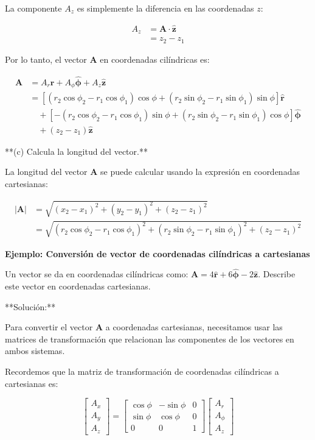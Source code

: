 \documentclass{book}
\begin{document}
La componente $A_z$ es simplemente la diferencia en las coordenadas $z$:

\begin{align*}
A_z &= \mathbf{A} \cdot \mathbf{\hat{z}} \\
&= z_2 - z_1
\end{align*}

Por lo tanto, el vector $\mathbf{A}$ en coordenadas cilíndricas es:

\begin{align*}
\mathbf{A} &= A_r \mathbf{\hat{r}} + A_{\phi} \mathbf{\hat{\phi}} + A_z \mathbf{\hat{z}} \\
&= [(r_2 \cos \phi_2 - r_1 \cos \phi_1) \cos \phi + (r_2 \sin \phi_2 - r_1 \sin \phi_1) \sin \phi] \mathbf{\hat{r}} \\
&\quad + [-(r_2 \cos \phi_2 - r_1 \cos \phi_1) \sin \phi + (r_2 \sin \phi_2 - r_1 \sin \phi_1) \cos \phi] \mathbf{\hat{\phi}} \\
&\quad + (z_2 - z_1) \mathbf{\hat{z}}
\end{align*}

**(c) Calcula la longitud del vector.**

La longitud del vector $\mathbf{A}$ se puede calcular usando la expresión en coordenadas cartesianas:

\begin{align*}
|\mathbf{A}| &= \sqrt{(x_2 - x_1)^2 + (y_2 - y_1)^2 + (z_2 - z_1)^2} \\
&= \sqrt{(r_2 \cos \phi_2 - r_1 \cos \phi_1)^2 + (r_2 \sin \phi_2 - r_1 \sin \phi_1)^2 + (z_2 - z_1)^2}
\end{align*}

\textbf{Ejemplo: Conversión de vector de coordenadas cilíndricas a cartesianas}

Un vector se da en coordenadas cilíndricas como: $\mathbf{A} = 4\mathbf{\hat{r}} + 6\mathbf{\hat{\phi}} - 2\mathbf{\hat{z}}$. Describe este vector en coordenadas cartesianas.

**Solución:**

Para convertir el vector $\mathbf{A}$ a coordenadas cartesianas, necesitamos usar las matrices de transformación que relacionan las componentes de los vectores en ambos sistemas.  

Recordemos que la matriz de transformación de coordenadas cilíndricas a cartesianas es:

\begin{equation*}
\begin{bmatrix} A_x \\ A_y \\ A_z \end{bmatrix} = 
\begin{bmatrix} \cos \phi & -\sin \phi & 0 \\ \sin \phi & \cos \phi & 0 \\ 0 & 0 & 1 \end{bmatrix}
\begin{bmatrix} A_r \\ A_{\phi} \\ A_z \end{bmatrix}
\end{equation*}
\end{document}
